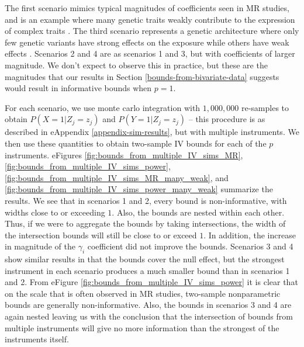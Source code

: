 \documentclass[
]{article}
\theoremstyle{plain}
\begin{document}
The first scenario mimics typical magnitudes of coefficients seen in MR studies, and is an example where many genetic traits weakly contribute to the expression of complex traits \autocite{loh_contrasting_2015,shi_contrasting_2016,nj_genetic_2017}. The third scenario represents a genetic architecture where only few genetic variants have strong effects on the exposure while others have weak effects \autocite{yang_common_2010}. Scenarios 2 and 4 are as scenarios 1 and 3, but with coefficients of larger magnitude. We don't expect to observe this in practice, but these are the magnitudes that our results in Section \ref{bounds-from-bivariate-data} suggests would result in informative bounds when \(p = 1\).

For each scenario, we use monte carlo integration with \(1,000,000\) re-samples to obtain \(P(X = 1 | Z_j = z_j)\) and \(P(Y = 1 | Z_j = z_j)\) -- this procedure is as described in eAppendix \ref{appendix-sim-results}, but with multiple instruments. We then use these quantities to obtain two-sample IV bounds for each of the \(p\) instruments. eFigures \ref{fig:bounds_from_multiple_IV_sims_MR}, \ref{fig:bounds_from_multiple_IV_sims_power}, \ref{fig:bounds_from_multiple_IV_sims_MR_many_weak}, and \ref{fig:bounds_from_multiple_IV_sims_power_many_weak} summarize the results. We see that in scenarios 1 and 2, every bound is non-informative, with widths close to or exceeding \(1\). Also, the bounds are nested within each other. Thus, if we were to aggregate the bounds by taking intersections, the width of the intersection bounds will still be close to or exceed \(1\). In addition, the increase in magnitude of the \(\gamma_i\) coefficient did not improve the bounds. Scenarios 3 and 4 show similar results in that the bounds cover the null effect, but the strongest instrument in each scenario produces a much smaller bound than in scenarios 1 and 2. From eFigure \ref{fig:bounds_from_multiple_IV_sims_power} it is clear that on the scale that is often observed in MR studies, two-sample nonparametric bounds are generally non-informative. Also, the bounds in scenarios 3 and 4 are again nested leaving us with the conclusion that the intersection of bounds from multiple instruments will give no more information than the strongest of the instruments itself.
\end{document}
